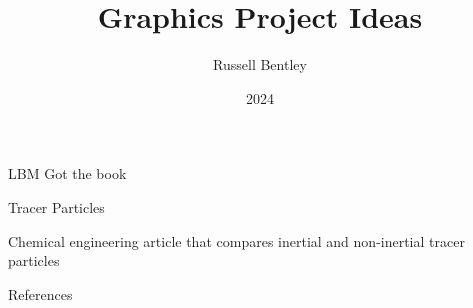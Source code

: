 \documentclass{beamer}
\title{Graphics Project Ideas}
\author{Russell Bentley}
\institute{Stony Brook}
\date{2024}
\begin{document}
\frame{\titlepage}





\begin{frame}{LBM}
Got the book \cite{Kruger2018}
\end{frame}

\begin{frame}{Tracer Particles}
  \begin{outline}
    \1 Chemical engineering article that compares inertial and non-inertial tracer particles \cite{Hofmann2022}
  \end{outline}
\end{frame}

\begin{frame}[allowframebreaks]{References}
    \tiny
    \printbibliography
\end{frame}
\end{document}
